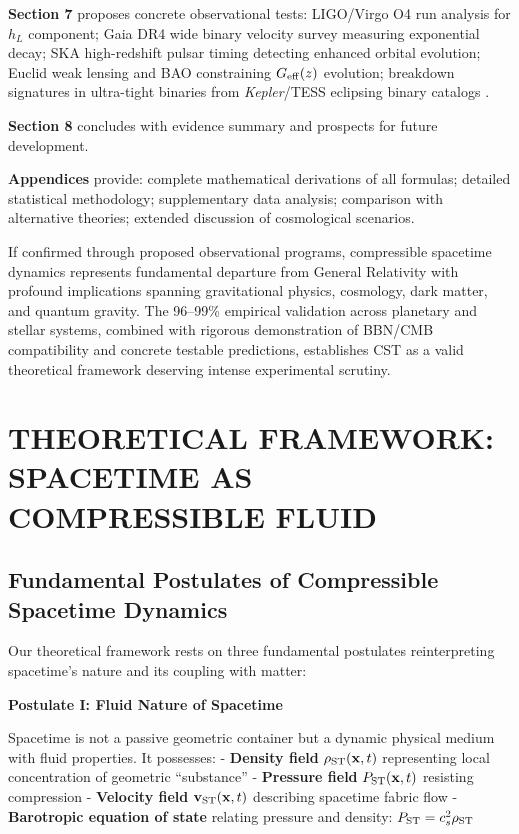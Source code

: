 \documentclass[11pt,a4paper]{article}
\begin{document}
\textbf{Section 7} proposes concrete observational tests: LIGO/Virgo O4
run analysis for \(h_L\) component; Gaia DR4 wide binary velocity survey
measuring exponential decay; SKA high-redshift pulsar timing detecting
enhanced orbital evolution; Euclid weak lensing and BAO constraining
\(G_{\rm eff}(z)\) evolution; breakdown signatures in ultra-tight
binaries from \emph{Kepler}/TESS eclipsing binary catalogs \cite{ref45}.

\textbf{Section 8} concludes with evidence summary and prospects for
future development.

\textbf{Appendices} provide: complete mathematical derivations of all
formulas; detailed statistical methodology; supplementary data analysis;
comparison with alternative theories; extended discussion of
cosmological scenarios.

If confirmed through proposed observational programs, compressible
spacetime dynamics represents fundamental departure from General
Relativity with profound implications spanning gravitational physics,
cosmology, dark matter, and quantum gravity. The 96--99\% empirical
validation across planetary and stellar systems, combined with rigorous
demonstration of BBN/CMB compatibility and concrete testable
predictions, establishes CST as a valid theoretical framework deserving
intense experimental scrutiny.

\hypertarget{theoretical-framework-spacetime-as-compressible-fluid}{%
\section{THEORETICAL FRAMEWORK: SPACETIME AS COMPRESSIBLE
FLUID}\label{theoretical-framework-spacetime-as-compressible-fluid}}

\hypertarget{fundamental-postulates-of-compressible-spacetime-dynamics}{%
\subsection{Fundamental Postulates of Compressible Spacetime
Dynamics}\label{fundamental-postulates-of-compressible-spacetime-dynamics}}

Our theoretical framework rests on three fundamental postulates
reinterpreting spacetime's nature and its coupling with matter:

\textbf{Postulate I: Fluid Nature of Spacetime}

Spacetime is not a passive geometric container but a dynamic physical
medium with fluid properties. It possesses: - \textbf{Density field}
\(\rho_{\rm ST}({\bf x},t)\) representing local concentration of
geometric ``substance'' - \textbf{Pressure field}
\(P_{\rm ST}({\bf x},t)\) resisting compression - \textbf{Velocity
field} \({\bf v}_{\rm ST}({\bf x},t)\) describing spacetime fabric flow
- \textbf{Barotropic equation of state} relating pressure and density:
\(P_{\rm ST} = c_s^2 \rho_{\rm ST}\)
\end{document}
